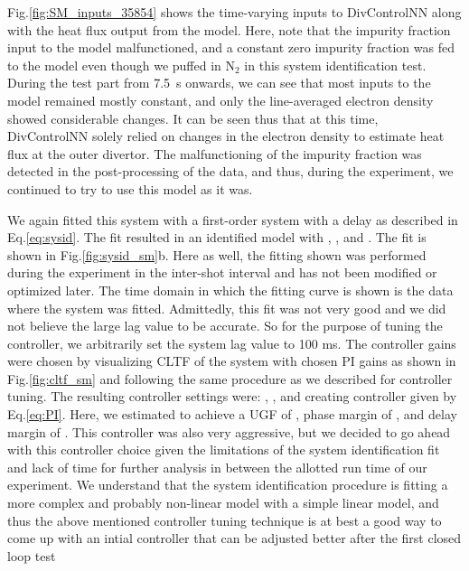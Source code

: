 Fig.\ref{fig:SM_inputs_35854} shows the time-varying inputs to DivControlNN along with the heat flux output from the model.
Here, note that the impurity fraction input to the model malfunctioned, and a constant zero impurity fraction was fed to the model even though we puffed in N$_2$ in this system identification test. During the test part from 7.5~s onwards, we can see that most inputs to the model remained mostly constant, and only the line-averaged electron density showed considerable changes.
It can be seen thus that at this time, DivControlNN solely relied on changes in the electron density to estimate heat flux at the outer divertor.
The malfunctioning of the impurity fraction was detected in the post-processing of the data, and thus, during the experiment, we continued to try to use this model as it was.

We again fitted this system with a first-order system with a delay as described in Eq.\ref{eq:sysid}.
The fit resulted in an identified model with \SMK, \SMTau, and \SML.
The fit is shown in Fig.\ref{fig:sysid_sm}b.
Here as well, the fitting shown was performed during the experiment in the inter-shot interval and has not been modified or optimized later.
The time domain in which the fitting curve is shown is the data where the system was fitted.
Admittedly, this fit was not very good and we did not believe the large lag value to be accurate.
So for the purpose of tuning the controller, we arbitrarily set the system lag value to 100 ms.
The controller gains were chosen by visualizing \ac{CLTF} of the system with chosen PI gains as shown in Fig.\ref{fig:cltf_sm} and following the same procedure as we described for \Afrac controller tuning.
The resulting controller settings were: \SMKp, \SMTi, and \SMstau{} creating controller given by Eq.\ref{eq:PI}.
Here, we estimated to achieve a \ac{UGF} of \SMUGF, phase margin of \SMPhaseMargin, and delay margin of \SMDelayMargin.
This controller was also very aggressive, but we decided to go ahead with this controller choice given the limitations of the system identification fit and lack of time for further analysis in between the allotted run time of our experiment.
We understand that the system identification procedure is fitting a more complex and probably non-linear model with a simple linear model, and thus the above mentioned controller tuning technique is at best a good way to come up with an intial controller that can be adjusted better after the first closed loop test
